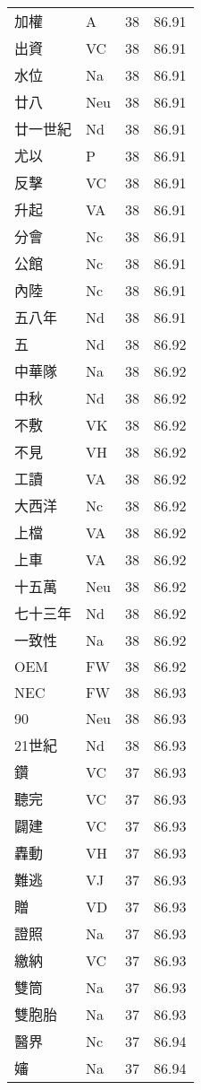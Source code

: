\documentclass[twocolumn]{book}
\begin{document}
\begin{supertabular}{llrr}
加權 & A & 38 &  86.91\\
出資 & VC & 38 &  86.91\\
水位 & Na & 38 &  86.91\\
廿八 & Neu & 38 &  86.91\\
廿一世紀 & Nd & 38 &  86.91\\
尤以 & P & 38 &  86.91\\
反擊 & VC & 38 &  86.91\\
升起 & VA & 38 &  86.91\\
分會 & Nc & 38 &  86.91\\
公館 & Nc & 38 &  86.91\\
內陸 & Nc & 38 &  86.91\\
五八年 & Nd & 38 &  86.91\\
五 & Nd & 38 &  86.92\\
中華隊 & Na & 38 &  86.92\\
中秋 & Nd & 38 &  86.92\\
不敷 & VK & 38 &  86.92\\
不見 & VH & 38 &  86.92\\
工讀 & VA & 38 &  86.92\\
大西洋 & Nc & 38 &  86.92\\
上檔 & VA & 38 &  86.92\\
上車 & VA & 38 &  86.92\\
十五萬 & Neu & 38 &  86.92\\
七十三年 & Nd & 38 &  86.92\\
一致性 & Na & 38 &  86.92\\
OEM & FW & 38 &  86.92\\
NEC & FW & 38 &  86.93\\
90 & Neu & 38 &  86.93\\
21世紀 & Nd & 38 &  86.93\\
鑽 & VC & 37 &  86.93\\
聽完 & VC & 37 &  86.93\\
闢建 & VC & 37 &  86.93\\
轟動 & VH & 37 &  86.93\\
難逃 & VJ & 37 &  86.93\\
贈 & VD & 37 &  86.93\\
證照 & Na & 37 &  86.93\\
繳納 & VC & 37 &  86.93\\
雙筒 & Na & 37 &  86.93\\
雙胞胎 & Na & 37 &  86.93\\
醫界 & Nc & 37 &  86.94\\
嬸 & Na & 37 &  86.94\\

\end{supertabular}
\end{document}

